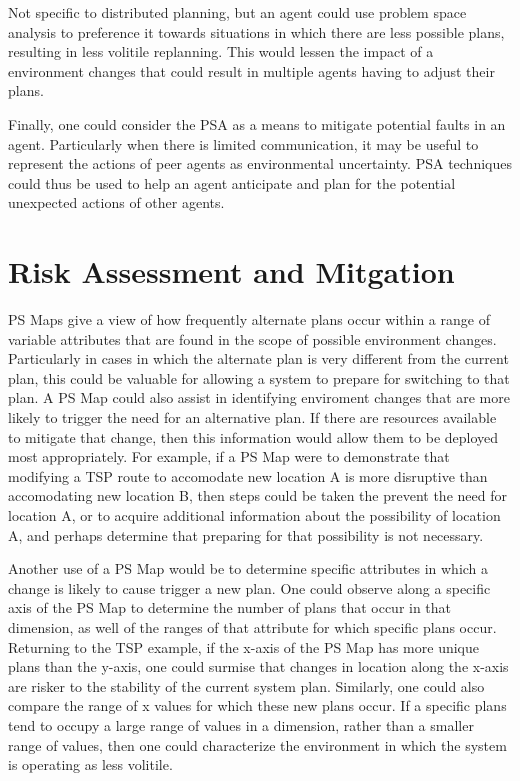 Not specific to distributed planning, but an agent could use problem space analysis to preference it towards situations in which there are less possible plans, resulting in less volitile replanning.  This would lessen the impact of a environment changes that could result in multiple agents having to adjust their plans.

Finally, one could consider the PSA as a means to mitigate potential faults in an agent.  Particularly when there is limited communication, it may be useful to represent the  actions of peer agents as environmental uncertainty. PSA techniques could thus be used to help an agent anticipate and plan for the potential unexpected actions of other agents.

\section{Risk Assessment and Mitgation}

PS Maps give a view of how frequently alternate plans occur within a range of variable attributes that are found in the scope of possible environment changes.  Particularly in cases in which the alternate plan is very different from the current plan, this could be valuable for allowing a system to prepare for switching to that plan.   A PS Map could also assist in identifying enviroment changes that are more likely to trigger the need for an alternative plan. If there are resources available to mitigate that change, then this information would allow them to be deployed most appropriately.  For example, if a PS Map were to demonstrate that modifying a TSP route to accomodate new location A is more disruptive than accomodating new location B, then steps could be taken the prevent the need for location A, or to acquire additional information about the possibility of location A, and perhaps determine that preparing for that possibility is not necessary.   

Another use of a PS Map would be to determine specific attributes in which a change is likely to cause trigger a new plan.  One could observe along a specific axis of the PS Map to determine the number of plans that occur in that dimension, as well of the ranges of that attribute for which specific plans occur.  Returning to the TSP example, if the x-axis of the PS Map has more unique plans than the y-axis, one could surmise that changes in location along the x-axis are risker to the stability of the current system plan.  Similarly, one could also compare the range of x values for which these new plans occur.  If a specific plans tend to occupy a large range of values in a dimension, rather than a smaller range of values, then one could characterize the environment in which the system is operating as less volitile.


